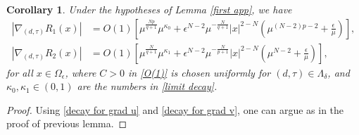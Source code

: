 \documentclass[reqno]{amsart}
\newtheorem{cor}[theorem]{Corollary}
\theoremstyle{remark}
\newcommand{\ep}{\epsilon}
\renewcommand{\(}{\left(}
\renewcommand{\)}{\right)}
\numberwithin{equation}{section}
\begin{document}
\begin{cor}\label{rem C1}
Under the hypotheses of Lemma \ref{first app}, we have
\begin{align*}
|\nabla_{(d,\tau)} R_1(x)|
& = O(1) \left[\mu^{\frac{Np}{q+1}} \mu^{\kappa_0} + \ep^{N-2}\mu^{-\frac{N}{q+1}}|x|^{2-N}\(\mu^{(N-2)p-2} + \frac{\ep}{\mu}\)\right], \\
|\nabla_{(d,\tau)} R_2(x)|
& = O(1) \left[\mu^{\frac{N}{q+1}} \mu^{\kappa_1} + \ep^{N-2}\mu^{-\frac{N}{p+1}} |x|^{2-N} \(\mu^{N-2} + \frac{\ep}{\mu}\)\right],
\end{align*}
for all $x \in \Omega_\ep$, where $C > 0$ in \eqref{O(1)} is chosen uniformly for $(d,\tau) \in \Lambda_\delta$, and $\kappa_0, \kappa_1 \in (0,1)$ are the numbers in \eqref{limit decay}.
\end{cor}
\begin{proof}
Using \eqref{decay for grad u} and \eqref{decay for grad v}, one can argue as in the proof of previous lemma.
\end{proof}
\end{document}
